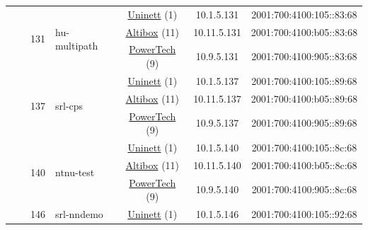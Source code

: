 \begin{small}
\begin{center}
\begin{longtable}{|c|c|c|c|c|c|c|c|}
  &  & \multirow{3}{*}{\tiny{131}} & \multicolumn{1}{|l|}{\multirow{3}{*}{\tiny{hu-multipath}}} & \multicolumn{2}{|c|}{\tiny{\href{https://www.uninett.no}{Uninett} (1)}} & \tiny{10.1.5.131} & \tiny{2001:700:4100:105::83:68} \\* \cline{5-5}\cline{6-6}\cline{7-7}\cline{8-8}
  &  &  &  & \multicolumn{2}{|c|}{\tiny{\href{https://www.altibox.no}{Altibox} (11)}} & \tiny{10.11.5.131} & \tiny{2001:700:4100:b05::83:68} \\* \cline{5-5}\cline{6-6}\cline{7-7}\cline{8-8}
  &  &  &  & \multicolumn{2}{|c|}{\tiny{\href{http://www.powertech.no}{PowerTech} (9)}} & \tiny{10.9.5.131} & \tiny{2001:700:4100:905::83:68} \\* \cline{3-3}\cline{4-4}\cline{5-5}\cline{6-6}\cline{7-7}\cline{8-8}
  &  & \multirow{3}{*}{\tiny{137}} & \multicolumn{1}{|l|}{\multirow{3}{*}{\tiny{srl-cps}}} & \multicolumn{2}{|c|}{\tiny{\href{https://www.uninett.no}{Uninett} (1)}} & \tiny{10.1.5.137} & \tiny{2001:700:4100:105::89:68} \\* \cline{5-5}\cline{6-6}\cline{7-7}\cline{8-8}
  &  &  &  & \multicolumn{2}{|c|}{\tiny{\href{https://www.altibox.no}{Altibox} (11)}} & \tiny{10.11.5.137} & \tiny{2001:700:4100:b05::89:68} \\* \cline{5-5}\cline{6-6}\cline{7-7}\cline{8-8}
  &  &  &  & \multicolumn{2}{|c|}{\tiny{\href{http://www.powertech.no}{PowerTech} (9)}} & \tiny{10.9.5.137} & \tiny{2001:700:4100:905::89:68} \\* \cline{3-3}\cline{4-4}\cline{5-5}\cline{6-6}\cline{7-7}\cline{8-8}
  &  & \multirow{3}{*}{\tiny{140}} & \multicolumn{1}{|l|}{\multirow{3}{*}{\tiny{ntnu-test}}} & \multicolumn{2}{|c|}{\tiny{\href{https://www.uninett.no}{Uninett} (1)}} & \tiny{10.1.5.140} & \tiny{2001:700:4100:105::8c:68} \\* \cline{5-5}\cline{6-6}\cline{7-7}\cline{8-8}
  &  &  &  & \multicolumn{2}{|c|}{\tiny{\href{https://www.altibox.no}{Altibox} (11)}} & \tiny{10.11.5.140} & \tiny{2001:700:4100:b05::8c:68} \\* \cline{5-5}\cline{6-6}\cline{7-7}\cline{8-8}
  &  &  &  & \multicolumn{2}{|c|}{\tiny{\href{http://www.powertech.no}{PowerTech} (9)}} & \tiny{10.9.5.140} & \tiny{2001:700:4100:905::8c:68} \\* \cline{3-3}\cline{4-4}\cline{5-5}\cline{6-6}\cline{7-7}\cline{8-8}
  &  & \multirow{3}{*}{\tiny{146}} & \multicolumn{1}{|l|}{\multirow{3}{*}{\tiny{srl-nndemo}}} & \multicolumn{2}{|c|}{\tiny{\href{https://www.uninett.no}{Uninett} (1)}} & \tiny{10.1.5.146} & \tiny{2001:700:4100:105::92:68} \\* \cline{5-5}\cline{6-6}\cline{7-7}\cline{8-8}

\end{longtable}
\end{center}
\end{small}
